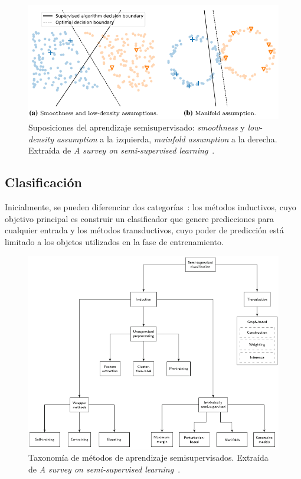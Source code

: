 \begin{figure}[h]
	\caption[Suposiciones del aprendizaje semisupervisado]{Suposiciones del aprendizaje semisupervisado: \textit{smoothness} y \textit{low-density assumption} a la izquierda, \textit{mainfold assumption} a la derecha. Extraída de \textit{A survey on semi-supervised learning}~\cite{engelen2020surveyOnSemiSupervised}.}
	\label{img:assumptions}
	\centering
	\includegraphics[width=\textwidth]{../img/memoria/3_assumptions.pdf}
\end{figure}


\subsection{Clasificación}

Inicialmente, se pueden diferenciar dos categorías~\cite{engelen2020surveyOnSemiSupervised}: los métodos inductivos, cuyo objetivo principal es construir un clasificador que genere predicciones para cualquier entrada y los métodos transductivos, cuyo poder de predicción está limitado a los objetos utilizados en la fase de entrenamiento.


\begin{figure}[h]
\caption[Taxonomía de métodos de aprendizaje semisupervisado]{Taxonomía de métodos de aprendizaje semisupervisados. Extraída de \textit{A survey on semi-supervised learning}~\cite{engelen2020surveyOnSemiSupervised}.}
\centering
\includegraphics[width=\textwidth]{../img/memoria/3_hoos_taxonomy.pdf}
\end{figure}

